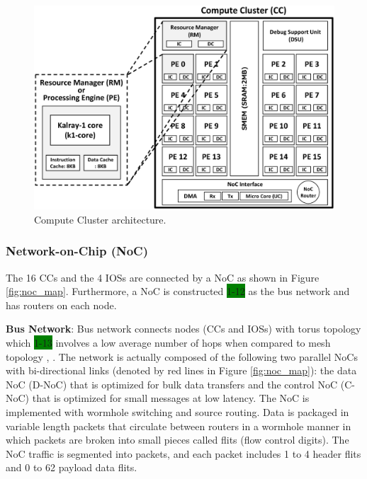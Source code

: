 \documentclass[conference,compsoc]{IEEEtran}
\begin{document}
\begin{figure}[t]
  \centering
  \includegraphics[width=1.0\linewidth]{../figure/cc_architecture.eps}
  \caption{\label{fig:cc_architecture}
    Compute Cluster architecture.}
\end{figure}


\subsubsection{Network-on-Chip (NoC)}
\label{sec:noc}
The 16 CCs and the 4 IOSs are connected by a NoC as shown in Figure \ref{fig:noc_map}.
Furthermore, a NoC is constructed \colorbox{green}{1-12} as the bus network and has routers on each node.

\textbf{Bus Network}:
Bus network connects nodes (CCs and IOSs) with torus topology \cite{dally2001route}
which \colorbox{green}{1-13} involves a low average number of hops when compared to mesh topology \cite{vangal200780}, \cite{taylor2002raw}.
The network is actually composed of the following two parallel NoCs with bi-directional links (denoted by red lines in Figure \ref{fig:noc_map}):
the data NoC (D-NoC) that is optimized for bulk data transfers and the control NoC (C-NoC) that is optimized for small messages at low latency.
The NoC is implemented with wormhole switching and source routing.
Data is packaged in variable length packets that circulate between routers in a wormhole manner in which packets are broken into small pieces called flits (flow control digits).
The NoC traffic is segmented into packets, and each packet includes 1 to 4 header flits and 0 to 62 payload data flits.
\end{document}
